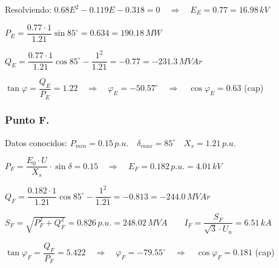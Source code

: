 			\vspace{0.1cm}
			Resolviendo: $0.68E^2 - 0.119E - 0.318 = 0 \quad \Rightarrow \quad E_E = 0.77 = 16.98\,kV$
			
			\vspace{0.1cm}
			$P_E = \dfrac{0.77\cdot 1}{1.21}\sin 85^\circ = 0.634 = 190.18\,MW$
			
			\vspace{0.1cm}
			$Q_E = \dfrac{0.77\cdot 1}{1.21}\cos 85^\circ - \dfrac{1^2}{1.21} = -0.77 = -231.3\,MV\!Ar$
			
			\vspace{0.1cm}
			$\tan \varphi = \dfrac{Q_E}{P_E} = 1.22 \quad \Rightarrow \quad \varphi_E = -50.57^\circ \quad \Rightarrow \quad \cos \varphi_E = 0.63$ (cap)
		
		\subsubsection*{Punto F.}
			Datos conocidos: $P_{min} = 0.15\,p.u.\quad \delta_{max} = 85^\circ\quad X_s = 1.21\,p.u.$
			
			\vspace{0.1cm}
			$P_F = \dfrac{E_0\cdot U}{X_s}\cdot \sin \delta = 0.15 \quad \Rightarrow \quad E_F = 0.182\,p.u. = 4.01\,kV$
			
			\vspace{0.1cm}
			$Q_F = \dfrac{0.182\cdot 1}{1.21}\cos 85^\circ - \dfrac{1^2}{1.21} = -0.813 = -244.0\,MV\!Ar$
			
			\vspace{0.1cm}
			$S_F = \sqrt{P_F^2 + Q_F^2} = 0.826\,p.u. = 248.02\,MV\!A \qquad I_F = \dfrac{S_F}{\sqrt{3}\cdot U_n} = 6.51\,kA$
			
			\vspace{0.1cm}
			$\tan \varphi_F = \dfrac{Q_F}{P_F} = 5.422 \quad \Rightarrow \quad \varphi_F = -79.55^\circ \quad \Rightarrow \quad \cos \varphi_F = 0.181$ (cap)
		
			